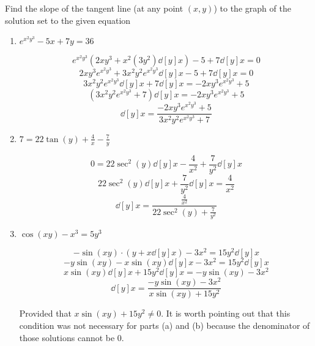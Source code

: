 \documentclass[handout,nooutcomes]{ximera}
\begin{document}
\begin{problem}
Find the slope of the tangent line (at any point $(x,y)$) to the graph of the solution set to the given equation

	\begin{enumerate}
	
	\item  $e^{x^2 y^3} - 5x + 7y = 36$
			\begin{freeResponse}
			$$ e^{x^2 y^3} \left( 2xy^3 + x^2 (3y^2)\dd[y]{x} \right) - 5 + 7\dd[y]{x} = 0 $$
			$$ 2xy^3 e^{x^2y^3} + 3x^2y^2e^{x^2y^3}\dd[y]{x} - 5 + 7\dd[y]{x} = 0 $$
			$$ 3x^2y^2e^{x^2y^3}\dd[y]{x} + 7\dd[y]{x} = -2xy^3 e^{x^2y^3} + 5 $$
			$$ \left( 3x^2y^2e^{x^2y^3} + 7 \right) \dd[y]{x} = -2xy^3 e^{x^2y^3} + 5 $$
			$$  \dd[y]{x} = \frac{-2xy^3 e^{x^2y^3} + 5}{3x^2 y^2 e^{x^2y^3} + 7} $$
			\end{freeResponse}
			
			
			
	\item  $7 = 22 \tan(y) + \frac{4}{x} - \frac{7}{y}$
			\begin{freeResponse}
			$$ 0 = 22 \sec^2 (y) \dd[y]{x} - \frac{4}{x^2} + \frac{7}{y^2} \dd[y]{x} $$
			$$ 22 \sec^2(y) \dd[y]{x} + \frac{7}{y^2} \dd[y]{x} = \frac{4}{x^2} $$
			$$ \dd[y]{x} = \frac{\frac{4}{x^2}}{22 \sec^2(y) + \frac{7}{y^2}} $$
			\end{freeResponse}
			
			
			
	\item  $\cos(xy) - x^3 = 5y^3$
			\begin{freeResponse}
			$$ -\sin(xy) \cdot \left(y + x \dd[y]{x} \right) - 3x^2 = 15y^2 \dd[y]{x} $$
			$$ -y \sin(xy) - x \sin(xy) \dd[y]{x} - 3x^2 = 15y^2 \dd[y]{x} $$
			$$ x \sin(xy) \dd[y]{x} + 15y^2 \dd[y]{x} = -y \sin(xy) - 3x^2 $$
			$$ \dd[y]{x} = \frac{-y \sin(xy) - 3x^2}{x \sin(xy) + 15y^2} $$
			
			Provided that $x \sin(xy) + 15y^2 \neq 0$.  It is worth pointing out that this condition was not necessary for parts (a) and (b) because the denominator of those solutions cannot be $0$.  
			\end{freeResponse}
			
			
			
	\end{enumerate}
			
			
			
		
\end{problem}
	
\end{document}
